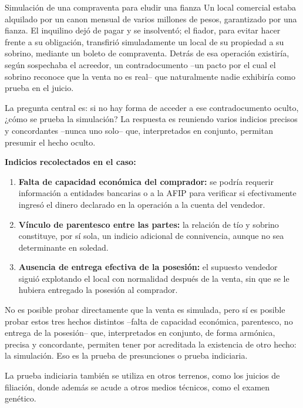 \documentclass[12pt,oneside]{book}
\begin{document}
\begin{example}{Simulación de una compraventa para eludir una fianza}
Un local comercial estaba alquilado por un canon mensual de varios millones de pesos, garantizado por una fianza. El inquilino dejó de pagar y se insolventó; el fiador, para evitar hacer frente a su obligación, transfirió simuladamente un local de su propiedad a su sobrino, mediante un boleto de compraventa. Detrás de esa operación existiría, según sospechaba el acreedor, un contradocumento --un pacto por el cual el sobrino reconoce que la venta no es real-- que naturalmente nadie exhibiría como prueba en el juicio.

La pregunta central es: si no hay forma de acceder a ese contradocumento oculto, ¿cómo se prueba la simulación? La respuesta es reuniendo varios indicios precisos y concordantes --nunca uno solo-- que, interpretados en conjunto, permitan presumir el hecho oculto.

\textbf{Indicios recolectados en el caso:}
\begin{enumerate}
    \item \textbf{Falta de capacidad económica del comprador:} se podría requerir información a entidades bancarias o a la AFIP para verificar si efectivamente ingresó el dinero declarado en la operación a la cuenta del vendedor.
    \item \textbf{Vínculo de parentesco entre las partes:} la relación de tío y sobrino constituye, por sí sola, un indicio adicional de connivencia, aunque no sea determinante en soledad.
    \item \textbf{Ausencia de entrega efectiva de la posesión:} el supuesto vendedor siguió explotando el local con normalidad después de la venta, sin que se le hubiera entregado la posesión al comprador.
\end{enumerate}

No es posible probar directamente que la venta es simulada, pero sí es posible probar estos tres hechos distintos --falta de capacidad económica, parentesco, no entrega de la posesión-- que, interpretados en conjunto, de forma armónica, precisa y concordante, permiten tener por acreditada la existencia de otro hecho: la simulación. Eso es la prueba de presunciones o prueba indiciaria.
\end{example}

\begin{note}
La prueba indiciaria también se utiliza en otros terrenos, como los juicios de filiación, donde además se acude a otros medios técnicos, como el examen genético.
\end{note}
\end{document}

